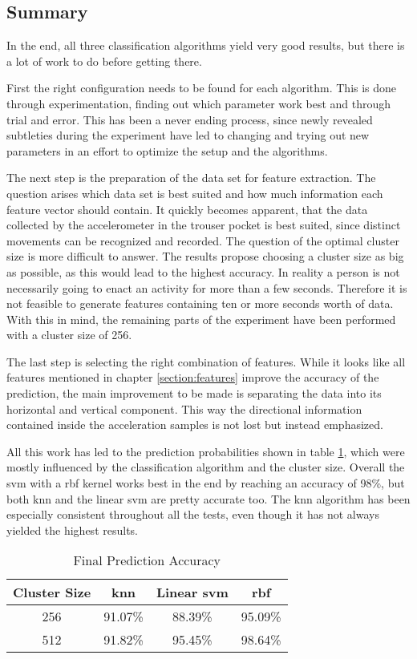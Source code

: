 \subsection{Summary}
In the end, all three classification algorithms yield very good results, but there is a lot of work to do before getting there.

First the right configuration needs to be found for each algorithm. This is done through experimentation, finding out which parameter work best and through trial and error. This has been a never ending process, since newly revealed subtleties during the experiment have led to changing and trying out new parameters in an effort to optimize the setup and the algorithms.

The next step is the preparation of the data set for feature extraction. The question arises which data set is best suited and how much information each feature vector should contain. It quickly becomes apparent, that the data collected by the accelerometer in the trouser pocket is best suited, since distinct movements can be recognized and recorded. The question of the optimal cluster size is more difficult to answer. The results propose choosing a cluster size as big as possible, as this would lead to the highest accuracy. In reality a person is not necessarily going to enact an activity for more than a few seconds. Therefore it is not feasible to generate features containing ten or more seconds worth of data. With this in mind, the remaining parts of the experiment have been performed with a cluster size of 256.

The last step is selecting the right combination of features. While it looks like all features mentioned in chapter \ref{section:features} improve the accuracy of the prediction, the main improvement to be made is separating the data into its horizontal and vertical component. This way the directional information contained inside the acceleration samples is not lost but instead emphasized.

All this work has led to the prediction probabilities shown in table \ref{table:final}, which were mostly influenced by the classification algorithm and the cluster size. Overall the \gls{svm} with a \gls{rbf} kernel works best in the end by reaching an accuracy of 98\%, but both \gls{knn} and the linear \gls{svm} are pretty accurate too. The \gls{knn} algorithm has been especially consistent throughout all the tests, even though it has not always yielded the highest results.

\begin{table}[!htb]
    \centering
    \begin{tabular}{@{}cccc@{}}
        \toprule
        Cluster Size & \gls{knn} & Linear \gls{svm} & \gls{rbf} \\
        \midrule
        256 & 91.07\% & 88.39\% & 95.09\% \\
        512 & 91.82\% & 95.45\% & 98.64\% \\
        \bottomrule
    \end{tabular}
    \caption{Final Prediction Accuracy}
    \label{table:final}
\end{table}
